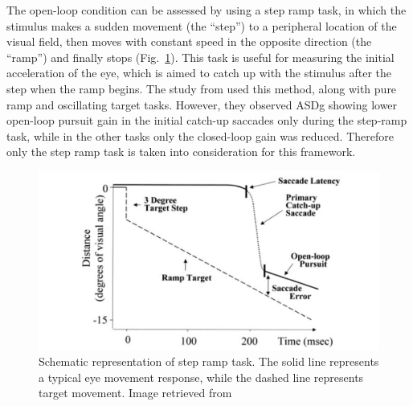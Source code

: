 The open-loop condition can be assessed by using a step ramp task, in which the stimulus makes a sudden movement (the “step”) to a peripheral location of the visual field, then moves with constant speed in the opposite direction (the “ramp”) and finally stops (Fig.~\ref{fig:steprampscheme}). This task is useful for measuring the initial acceleration of the eye, which is aimed to catch up with the stimulus after the step when the ramp begins. The study from \cite{takarae2004smoothpursuit} used this method, along with pure ramp and oscillating target tasks. However, they observed ASDg showing lower open-loop pursuit gain in the initial catch-up saccades only during the step-ramp task, while in the other tasks only the closed-loop gain was reduced. Therefore only the step ramp task is taken into consideration for this framework.

\begin{figure}[h]
  \centering
  \includegraphics[width=.7\textwidth]{figures/steprampscheme-03.jpg}
  \caption[Step-ramp paradigm scheme]{Schematic representation of step ramp task. The solid line represents a typical eye movement response, while the dashed line represents target movement. Image retrieved from \cite{takarae2004smoothpursuit}}
  \label{fig:steprampscheme}
\end{figure}


